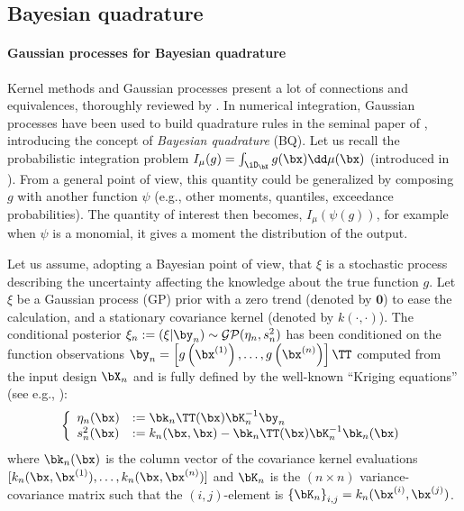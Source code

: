 
\subsection{Bayesian quadrature}
\paragraph{Gaussian processes for Bayesian quadrature}%
Kernel methods and Gaussian processes present a lot of connections and equivalences, thoroughly reviewed by \cite{motonobu_2018}. 
In numerical integration, Gaussian processes have been used to build quadrature rules in the seminal paper of \cite{ohagan_1991}, introducing the concept of \emph{Bayesian quadrature} (BQ). 
Let us recall the probabilistic integration problem $I_\mu(g) = \int_{\iD_\bX} g(\bx) \dd \mu(\bx)$ (introduced in ). 
From a general point of view, this quantity could be generalized by composing $g$ with another function $\psi$ (e.g., other moments, quantiles, exceedance probabilities). 
The quantity of interest then becomes, $I_\mu(\psi(g))$, for example when $\psi$ is a monomial, it gives a moment the distribution of the output.

Let us assume, adopting a Bayesian point of view, that $\xi$ is a stochastic process describing the uncertainty affecting the knowledge about the true function $g$. 
Let $\xi$ be a Gaussian process (GP) prior with a zero trend (denoted by $\textbf{0}$) to ease the calculation, and a stationary covariance kernel (denoted by $k(\cdot, \cdot)$). 
The conditional posterior $\xi_n := (\xi | \by_n) \sim \mathcal{GP}(\eta_n, s_n^2)$ has been conditioned on the function observations $\by_n = \left[g\left(\bx^{(1)}\right), \ldots, g\left(\bx^{(n)}\right)\right]\TT$ computed from the input design $\bX_n$ and is fully defined by the well-known ``Kriging equations'' (see e.g., \cite{rasmussen_2006}):
\begin{equation}
    \left\{
    \begin{array}{ll}
        \eta_n(\bx) &:= \bk_n\TT(\bx) \bK_n^{-1} \by_n\\
        s_n^2(\bx) &:= k_n(\bx, \bx) - \bk_n\TT(\bx) \bK_n^{-1} \bk_n(\bx)
    \end{array}
\right.
\label{eq:kriging}
\end{equation}
where $\bk_n(\bx)$ is the column vector of the covariance kernel evaluations $[k_n(\bx, \bx^{(1)}), \dots,\allowbreak k_n(\bx, \bx^{(n)})]$ and $\bK_n$ is the $(n \times n)$ variance-covariance matrix such that the $(i, j)$-element is $\left\{\bK_n \right\}_{i, j}=k_n(\bx^{(i)}, \bx^{(j)})$.

